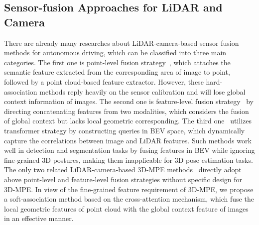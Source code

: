 \documentclass[letterpaper]{article} %
\begin{document}


\subsection{Sensor-fusion Approaches for LiDAR and Camera}
There are already many researches about LiDAR-camera-based sensor fusion methods for autonomous driving, which can be classified into three main categories. The first one is point-level fusion strategy~\cite{vora2020pointpainting,wang2021pointaugmenting,zheng2022multi}, which attaches the semantic feature extracted from the corresponding area of image to point, followed by a point cloud-based feature extractor. However, these hard-association methods reply heavily on the sensor calibration and will lose global context information of images. The second one is feature-level fusion strategy~\cite{piergiovanni20214d,MV3D,liang2018deep,ku2018joint} by directing concatenating features from two modalities, which considers the fusion of global context but lacks local geometric corresponding. The third one~\cite{bai2022transfusion,li2022deepfusion,prakash2021multi,liu2022bevfusion} utilizes transformer strategy by constructing queries in BEV space, which dynamically capture the correlations between image and LiDAR features. Such methods work well in detection and segmentation tasks by fusing features in BEV while ignoring fine-grained 3D postures, making them inapplicable for 3D pose estimation tasks. The only two related LiDAR-camera-based 3D-MPE methods~\cite{furst2021hperl,zheng2022multi} directly adopt above point-level and feature-level fusion strategies without specific design for 3D-MPE. In view of the fine-grained feature requirement of 3D-MPE, we propose a soft-association method based on the cross-attention mechanism, which fuse the local geometric features of point cloud with the global context feature of images in an effective manner. 
\end{document}

